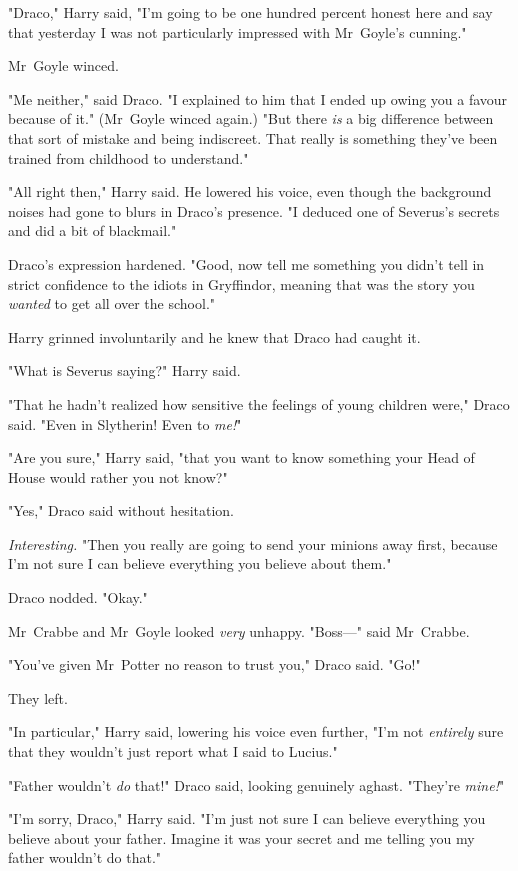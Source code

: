 "Draco," Harry said, "I'm going to be one hundred percent honest here and say
that yesterday I was not particularly impressed with Mr~Goyle's cunning."

Mr~Goyle winced.

"Me neither," said Draco. "I explained to him that I ended up owing you a favour
because of it." (Mr~Goyle winced again.) "But there \emph{is} a big difference
between that sort of mistake and being indiscreet. That really is something
they've been trained from childhood to understand."

"All right then," Harry said. He lowered his voice, even though the background
noises had gone to blurs in Draco's presence. "I deduced one of Severus's
secrets and did a bit of blackmail."

Draco's expression hardened. "Good, now tell me something you didn't tell in
strict confidence to the idiots in Gryffindor, meaning that was the story you
\emph{wanted} to get all over the school."

Harry grinned involuntarily and he knew that Draco had caught it.

"What is Severus saying?" Harry said.

"That he hadn't realized how sensitive the feelings of young children were,"
Draco said. "Even in Slytherin! Even to \emph{me!}"

"Are you sure," Harry said, "that you want to know something your Head of House
would rather you not know?"

"Yes," Draco said without hesitation.

\emph{Interesting.} "Then you really are going to send your minions away first,
because I'm not sure I can believe everything you believe about them."

Draco nodded. "Okay."

Mr~Crabbe and Mr~Goyle looked \emph{very} unhappy. "Boss---" said Mr~Crabbe.

"You've given Mr~Potter no reason to trust you," Draco said. "Go!"

They left.

"In particular," Harry said, lowering his voice even further, "I'm not
\emph{entirely} sure that they wouldn't just report what I said to Lucius."

"Father wouldn't \emph{do} that!" Draco said, looking genuinely aghast.
"They're \emph{mine!}"

"I'm sorry, Draco," Harry said. "I'm just not sure I can believe everything you
believe about your father. Imagine it was your secret and me telling you my
father wouldn't do that."


